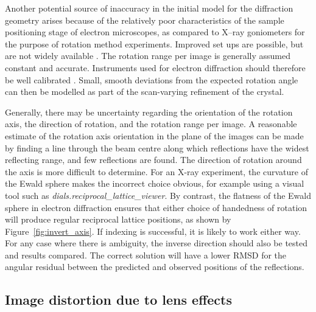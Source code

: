 \documentclass[preprint]{iucr}
\newcommand{\dialsreciprocallatticeviewer}{\emph{dials.reciprocal\_lattice\_viewer}\xspace}
\begin{document}
Another potential source of inaccuracy in the initial model for the diffraction
geometry arises because of the relatively poor characteristics of the sample
positioning stage of electron microscopes, as compared to X--ray goniometers for the
purpose of rotation method experiments. Improved set ups are possible,
but are not widely available \cite{Yonekura2015,Shi2016}.
The rotation range per image is generally assumed constant and accurate.
Instruments used
for electron diffraction should therefore be well calibrated
\cite{gemmi_adt:2015}. Small, smooth deviations from the expected rotation angle
can then be modelled as part of the scan-varying refinement of the crystal.

Generally, there may be
uncertainty regarding the orientation of the rotation axis, the direction of
rotation, and the rotation range per image. A reasonable estimate of the
rotation axis orientation in the plane of the images can be made by finding a
line through the beam centre along which reflections have the widest reflecting
range, and few reflections are found. The direction of rotation around the axis
is more difficult to determine. For an X-ray experiment, the curvature of the
Ewald sphere makes the incorrect choice obvious, for example using a visual
tool such as \dialsreciprocallatticeviewer \cite{Winter2018}. By contrast, the
flatness of the Ewald sphere in electron diffraction ensures that either choice
of handedness of rotation will produce regular reciprocal lattice positions,
as shown by Figure~\ref{fig:invert_axis}. If indexing is successful, it is
likely to work either way. For any case where there is ambiguity, the inverse
direction should also be tested and results compared. The correct solution will
have a lower RMSD for the angular residual between the predicted and observed
positions of the reflections.

\subsection{Image distortion due to lens effects \label{sec:distortion}}
\end{document}

